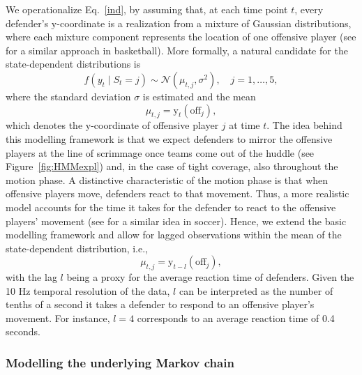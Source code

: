 \documentclass[namedate,webpdf,modern,medium]{oup-authoring-template}
\begin{document}
We operationalize Eq.~\ref{ind}, by assuming that, at each time point $t$, every defender's $\mathrm{y}$-coordinate is a realization from a mixture of Gaussian distributions, where each mixture component represents the location of one offensive player (see \citealp{franks2015} for a similar approach in basketball). 
More formally, a natural candidate for the state-dependent distributions is
\begin{equation}
\label{eqn:state_dep}
  f(y_t \mid S_t = j) \sim \mathcal{N}(\mu_{t,j}, \sigma^2), \quad j = 1, \ldots, 5,  
\end{equation}
where the standard deviation $\sigma$ is estimated and the mean
$$\mu_{t,j} = \mathrm{y}_t(\text{off}_j),$$ 
which denotes the $\mathrm{y}$-coordinate of offensive player $j$ at time $t$. The idea behind this modelling framework is that we expect defenders to mirror the offensive players at the line of scrimmage once teams come out of the huddle (see Figure~\ref{fig:HMMexpl}) and, in the case of tight coverage, also throughout the motion phase. 
A distinctive characteristic of the motion phase is that when offensive players move, defenders react to that movement. Thus, a more realistic model accounts for the time it takes for the defender to react to the offensive players' movement (see \citealp{wu2023evaluation} for a similar idea in soccer). Hence, we extend the basic modelling framework and allow for lagged observations within the mean of the state-dependent distribution, i.e., 
\begin{equation}\label{eq:lag}    
\mu_{t,j} = \mathrm{y}_{t-l}(\text{off}_j),
\end{equation}
with the lag $l$ being a proxy for the average reaction time of defenders. 
Given the 10 Hz temporal resolution of the data, $l$ can be interpreted as the number of tenths of a second it takes a defender to respond to an offensive player’s movement. For instance, $l = 4$ corresponds to an average reaction time of 0.4 seconds.

\subsubsection{Modelling the underlying Markov chain}
\label{sec:MC_dets}
\end{document}
